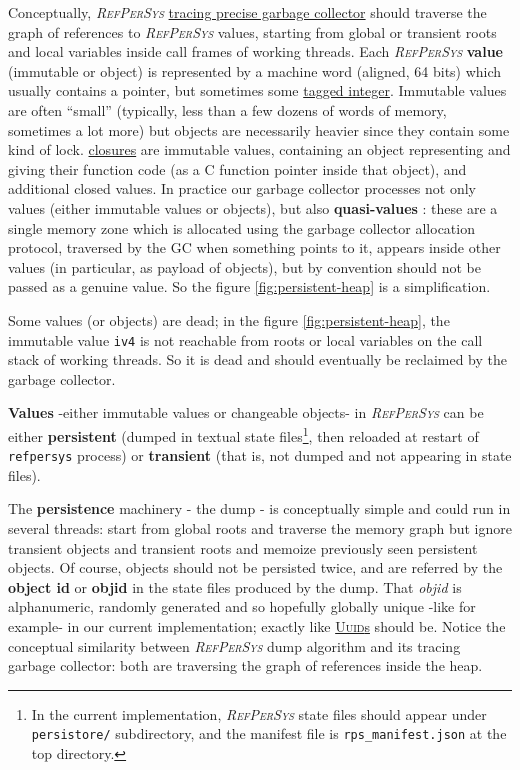 \documentclass[11pt,a4paper,svgnames]{article}
\newcommand{\RefPerSys}{{\textit{\textsc{RefPerSys}}}}
\begin{document}
Conceptually, {\RefPerSys}
\href{https://en.wikipedia.org/wiki/Tracing_garbage_collection}{tracing
  precise garbage collector} should traverse the graph of references
to {\RefPerSys} values, starting from global or transient roots and
local variables inside call frames of working threads. Each
{\RefPerSys} \textbf{value}  (immutable or object) is
represented by a machine word (aligned, 64 bits) which usually
contains a pointer, but sometimes some
\href{https://en.wikipedia.org/wiki/Tagged\_pointer}{tagged integer}.
Immutable values are often ``small'' (typically, less than a few dozens of words of memory, sometimes a lot more) but
objects are necessarily heavier since they contain some kind of
lock. \href{https://en.wikipedia.org/wiki/Closure\_(computer_programming)}{closures}
are immutable values, containing an object representing and giving
their function code (as a C function pointer inside that object), and
additional closed values. In practice our garbage collector processes
not only values (either immutable values or objects), but also
\textbf{quasi-values} : these are a single memory
zone which is allocated using the garbage collector allocation
protocol, traversed by the GC when something points to it, appears
inside other values (in particular, as payload  of objects), but by
convention should not be passed as a genuine value. So the figure
\ref{fig:persistent-heap} is a simplification.

Some values (or objects) are dead; in the figure
\ref{fig:persistent-heap}, the immutable value \texttt{iv4} is not
reachable from roots or local variables on the call stack of working
threads. So it is dead and should eventually be reclaimed by the
garbage collector.

\textbf{Values} -either immutable values or changeable objects- in
       {\RefPerSys} can be either \textbf{persistent} (dumped in
       textual state files\footnote{In the current implementation,
       {\RefPerSys} state files should appear under
       \texttt{persistore/} subdirectory, and the manifest file is
       \texttt{rps\_manifest.json} at the top directory.}, then
       reloaded at restart of \texttt{refpersys} process) or
       \textbf{transient} (that is, not dumped and not appearing in
       state files).

The \textbf{persistence} machinery - the dump - is conceptually simple
and could run in several threads: start from global roots and traverse
the memory graph but ignore transient objects and transient roots and
memoize previously seen persistent objects. Of course, objects should
not be persisted twice, and are referred by the \textbf{object id} or
\textbf{objid} in the state files produced by the dump. That
\textit{objid}  is alphanumeric, randomly generated and so hopefully
globally unique -like {}
for example- in our current implementation; exactly like
\href{https://en.wikipedia.org/wiki/Universally_unique_identifier}{\textsc{Uuid}s}
should be. Notice the conceptual similarity between {\RefPerSys} dump
algorithm and its tracing garbage collector: both are traversing the
graph of references inside the heap.
\end{document}
